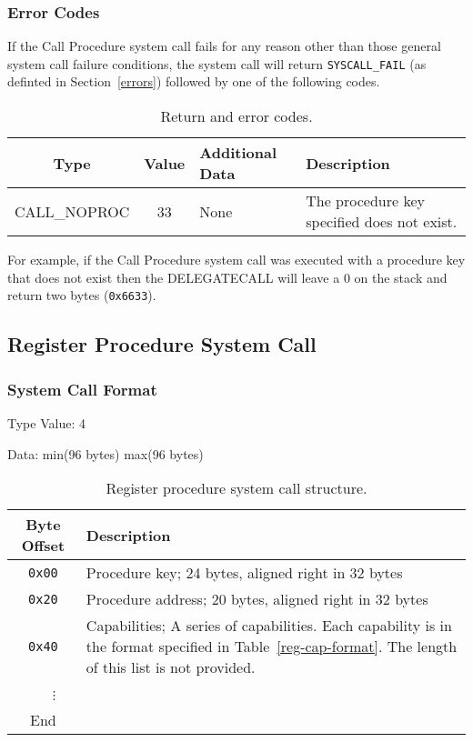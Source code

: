 \documentclass[english,a4paper]{article}
\let\oldparagraph\subsubsection
\renewcommand{\subsubsection}[1]{\oldparagraph{#1}\mbox{}}
\begin{document}
\subsubsection{Error Codes}
If the Call Procedure system call fails for any reason other than those
general system call failure conditions, the system call will return
\texttt{SYSCALL\_FAIL} (as definted in Section~\ref{errors}) followed by one of
the following codes.

\begin{table}[H]
  \caption{Return and error codes.}
  \centering{}%
  \begin{tabularx}{\textwidth}{c|c|l|X}
    \hline
    Type & Value & Additional Data & Description \\
    \hline
    \hline
    CALL\_NOPROC  & 33 & None & The procedure key specified does not exist. \\
    \hline
  \end{tabularx}
\end{table}

For example, if the Call
Procedure system call was executed with a procedure key that does not exist then
the DELEGATECALL will leave a 0 on the stack and return two bytes
(\texttt{0x6633}).

\subsection{Register Procedure System Call}

\subsubsection{System Call Format}
Type Value: 4

Data: min(96 bytes) max(96 bytes)

\begin{table}[H]
  \caption{Register procedure system call structure.}
  \centering{}%
  \begin{tabularx}{\textwidth}{c|X}
    \hline
    Byte Offset & Description\\
    \hline
    \hline
    \texttt{0x00} & Procedure key; 24 bytes, aligned right in 32 bytes \\
    \texttt{0x20} & Procedure address; 20 bytes, aligned right in 32 bytes\\
    \texttt{0x40} & Capabilities; A series of capabilities. Each capability is
      in the format specified in Table~\ref{reg-cap-format}. The length of
      this list is not provided.\\
    ~~~$\vdots$ & \\
    \hline
    End &  \\
    \hline
  \end{tabularx}
\end{table}
\end{document}
